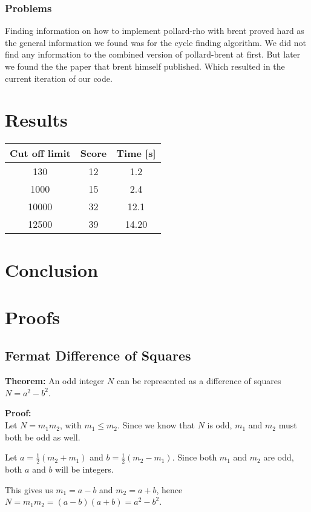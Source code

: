 \documentclass[a4paper, 12pt]{report}
\begin{document}
\subsection{Problems}
Finding information on how to implement pollard-rho with brent proved hard as the general information we found was for the cycle finding algorithm. We did not find any information to the combined version of pollard-brent at first. But later we found the the paper that brent himself published. Which resulted in the current iteration of our code.
\chapter{Results}

\begin{tabular} {c c c}
Cut off limit 	&	 Score 	& Time [s] \\ \hline
130		&	12		& 1.2 \\
1000	&	15		& 2.4 \\
10000 	& 	32		& 12.1 \\
12500	&	39		&14.20 \\

\end{tabular}
\chapter{Conclusion}
\appendix
\chapter{Proofs}
\section{Fermat Difference of Squares}
\label{sec:fermatproof}
\begin{description}
\item{\bf Theorem:} An odd integer $N$ can be represented as a difference of squares $N = a^2 - b^2$.


\item{\bf Proof:} \\
Let $ N = m_1m_2 $, with $ m_1 \le m_2 $. Since we know that $N$ is odd, $m_1$ and $m_2$ must both be odd as well.

Let $ a = \frac{1}{2} (m_2 + m_1) $ and $ b = \frac{1}{2} (m_2 - m_1) $. Since both $m_1$ and $m_2$ are odd, both $a$ and $b$ will be integers. 

This gives us $m_1 = a - b$ and $m_2 = a + b $, hence $N = m_1m_2 = (a - b)(a + b) = a^2 - b^2$.

\end{description}
\end{document}
